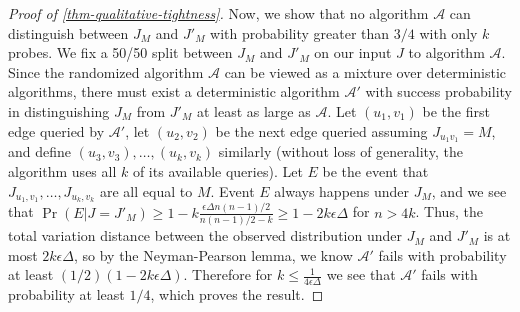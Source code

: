 \documentclass[final, 12pt]{colt2018}
\theoremstyle{definition}
\theoremstyle{plain}
\begin{document}
\begin{proof}[Proof of \cref{thm-qualitative-tightness}]
Now, we show that no algorithm $\mathcal A$ can distinguish between
$J_M$ and $J'_M$ with probability greater than $3/4$ with only $k$ probes.
We fix a 50/50
split between $J_M$ and $J'_M$ on our input $J$ to algorithm $\mathcal A$.
Since the randomized algorithm $\mathcal A$ can be viewed as a mixture
over deterministic algorithms, %
there must exist a deterministic algorithm $\mathcal A'$ with success probability
in distinguishing $J_M$ from $J'_M$ at least as large as $\mathcal A$. Let $(u_1,v_1)$
be the first edge queried by $\mathcal A'$, let $(u_2,v_2)$ be the next edge queried
assuming $J_{u_1 v_1} = M$, and define $(u_3,v_3), \ldots, (u_k,v_k)$ similarly (without loss of generality,
the algorithm uses all $k$ of its available queries). Let $E$ be the event that
$J_{u_1,v_1}, \ldots, J_{u_k,v_k}$ are all equal to $M$. Event $E$ always
happens under $J_M$, and %
we see that $\Pr(E|J = J'_M) \ge 1 - k \frac{\epsilon \Delta n(n-1)/2}{n(n - 1)/2 - k} \ge 1 - 2k \epsilon \Delta$ for $n > 4k$. Thus, the total variation distance between the observed distribution
under $J_M$ and $J'_M$ is at most $2k \epsilon \Delta$,
so by the Neyman-Pearson lemma, we know $\mathcal A'$ fails with probability at least $(1/2)(1 - 2k \epsilon \Delta)$.
Therefore for $k \le \frac{1}{4\epsilon\Delta}$ we see that $\mathcal A'$ fails with probability at least $1/4$,
which proves the result.
\end{proof}
\end{document}
